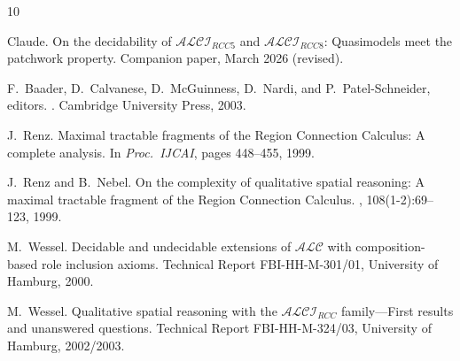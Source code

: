 \documentclass[a4paper,11pt]{article}
\theoremstyle{definition}
\begin{document}

\begin{thebibliography}{10}

Claude.
\newblock On the decidability of {$\mathcal{ALCI}_{\mathit{RCC5}}$} and
  {$\mathcal{ALCI}_{\mathit{RCC8}}$}: Quasimodels meet the patchwork
  property.
\newblock Companion paper, March 2026 (revised).

F.~Baader, D.~Calvanese, D.~McGuinness, D.~Nardi, and P.~Patel-Schneider,
  editors.
.
\newblock Cambridge University Press, 2003.

J.~Renz.
\newblock Maximal tractable fragments of the {Region Connection Calculus}: A
  complete analysis.
\newblock In {\em Proc.\ IJCAI}, pages 448--455, 1999.

J.~Renz and B.~Nebel.
\newblock On the complexity of qualitative spatial reasoning: A maximal
  tractable fragment of the {Region Connection Calculus}.
, 108(1-2):69--123, 1999.

M.~Wessel.
\newblock Decidable and undecidable extensions of {$\mathcal{ALC}$} with
  composition-based role inclusion axioms.
\newblock Technical Report FBI-HH-M-301/01, University of Hamburg, 2000.

M.~Wessel.
\newblock Qualitative spatial reasoning with the
  {$\mathcal{ALCI}_\mathit{RCC}$} family---{F}irst results and unanswered
  questions.
\newblock Technical Report FBI-HH-M-324/03, University of Hamburg, 2002/2003.

\end{thebibliography}
\end{document}
